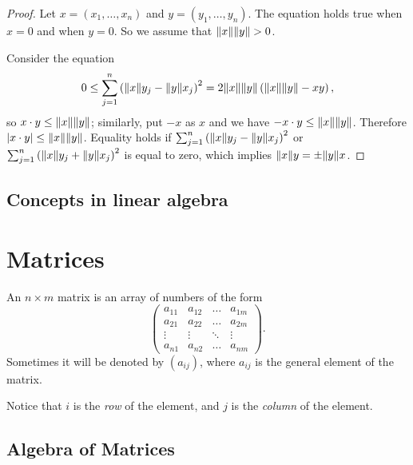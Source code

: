 \documentclass[main.tex]{subfiles}
\begin{document}
		\begin{proof}
			Let $x = (x_1, \ldots, x_n)$ and $y = (y_1, \ldots, y_n)$. The equation holds true when $x = 0$ and when $y = 0$. So we assume that $\lVert x\rVert \lVert y\rVert > 0$.
			
			Consider the equation
			\begin{equation*}
				0 \leq \sum_{j = 1}^n \left(\lVert x\rVert y_j - \lVert y\rVert x_j\right)^2 = 2\lVert x\rVert \lVert y\rVert \left(\lVert x\rVert \lVert y\rVert - xy\right),
			\end{equation*}
			so $x \cdot y \leq \lVert x\rVert \lVert y\rVert$; similarly, put $ - x $ as $x$ and we have $- x \cdot y \leq \lVert x\rVert\lVert y\rVert$. Therefore $\lvert x \cdot y\rvert \leq \lVert x\rVert \lVert y\rVert$. Equality holds if $\sum_{j = 1}^n \left(\lVert x\rVert y_j - \lVert y\rVert x_j\right)^2$ or $\sum_{j = 1}^n \left(\lVert x\rVert y_j + \lVert y\rVert x_j\right)^2$ is equal to zero, which implies $ \lVert x\rVert y = \pm \lVert y\rVert x$.
		\end{proof}
	
		\subsection{Concepts in linear algebra}
	\section{Matrices}
		\begin{definition}
			An $n \times m$ matrix is an array of numbers of the form
			\begin{equation*}
				\begin{pmatrix}
				a_{11} & a_{12} & \ldots & a_{1m} \\
				a_{21} & a_{22} & \ldots & a_{2m} \\
				\vdots & \vdots & \ddots & \vdots \\
				a_{n1} & a_{n2} & \ldots & a_{nm}
				\end{pmatrix}.
			\end{equation*}
			Sometimes it will be denoted by $(a_{ij})$, where $a_{ij}$ is the general element of the matrix.
		\end{definition}
			Notice that $i$ is the \textit{row} of the element, and $j$ is the \textit{column} of the element.
		\subsection{Algebra of Matrices}
		
\end{document}
